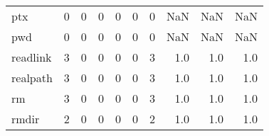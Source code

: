 \begin{longtable}{lrrrrrrrrr}
ptx       &                                       0 &                                                  0 &                                                  0 &                                                  0 &                                                  0 &                                                  0 &                                                NaN &                                    NaN &                                  NaN \\
pwd       &                                       0 &                                                  0 &                                                  0 &                                                  0 &                                                  0 &                                                  0 &                                                NaN &                                    NaN &                                  NaN \\
readlink  &                                       3 &                                                  0 &                                                  0 &                                                  0 &                                                  0 &                                                  3 &                                                1.0 &                                    1.0 &                                  1.0 \\
realpath  &                                       3 &                                                  0 &                                                  0 &                                                  0 &                                                  0 &                                                  3 &                                                1.0 &                                    1.0 &                                  1.0 \\
rm        &                                       3 &                                                  0 &                                                  0 &                                                  0 &                                                  0 &                                                  3 &                                                1.0 &                                    1.0 &                                  1.0 \\
rmdir     &                                       2 &                                                  0 &                                                  0 &                                                  0 &                                                  0 &                                                  2 &                                                1.0 &                                    1.0 &                                  1.0 \\

\end{longtable}
